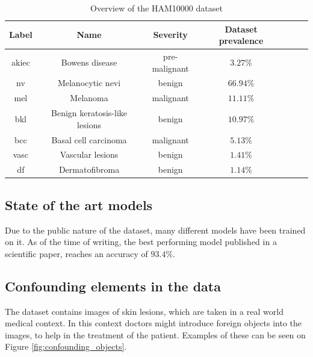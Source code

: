 \begin{table}[ht]
\begin{center}
\begin{tabular}{|c|c|c|c|c|c|c|}
\hline
Label    & Name                          & Severity      & Dataset prevalence \\ \hline
akiec    & Bowens disease                & pre-malignant & $3.27\%$           \\ \hline
nv       & Melanocytic nevi              & benign        & $66.94\%$          \\ \hline
mel      & Melanoma                      & malignant     & $11.11\%$          \\ \hline
bkl      & Benign keratosis-like lesions & benign        & $10.97\%$          \\ \hline
bcc      & Basal cell carcinoma          & malignant     & $5.13\%$           \\ \hline
vasc     & Vascular lesions              & benign        & $1.41\%$           \\ \hline
df       & Dermatofibroma                & benign        & $1.14\%$           \\ \hline
\end{tabular}
\end{center}

\caption{Overview of the HAM10000 dataset}
\label{table:ham10000}
\end{table}

\subsection{State of the art models}\label{sec:state-of-the-art}
Due to the public nature of the dataset, many different models have been trained on it.
As of the time of writing, the best performing model published in a scientific paper,
reaches an accuracy of $93.4\%$\cite{datta2021soft}.

\subsection{Confounding elements in the data} \label{sec:confounding}
The dataset contains images of skin lesions, which are taken in a real world medical context.
In this context doctors might introduce foreign objects into the images,
to help in the treatment of the patient.
Examples of these can be seen on Figure \ref{fig:confounding_objects}.

